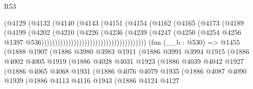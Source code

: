 \begin{lexlean}{R53}
\begin{coremodule}
                                            (@4129
                                              (@4132
                                                (@4140
                                                  (@4143
                                                    (@4151
                                                      (@4154
                                                        (@4162
                                                          (@4165
                                                            (@4173
                                                              (@4189
                                                                (@4199
                                                                  (@4202
                                                                    (@4210
                                                                      (@4226
                                                                        (@4236
                                                                          (@4239
                                                                            (@4247
                                                                              (@4250
                                                                                (@4254
                                                                                  @4256
                                                                                  @1397
                                                                                  @536)))))))))))))))))))))))))))))))))))))))
    (fun (__b : @530) =>
    @1455
      (@1888
        @1907
        (@1886
          @3980
          @3983
          @1911
          (@1886
            @3991
            @3994
            @1915
            (@1886
              @4002
              @4005
              @1919
              (@1886
                @4028
                @4031
                @1923
                (@1886
                  @4039
                  @4042
                  @1927
                  (@1886
                    @4065
                    @4068
                    @1931
                    (@1886
                      @4076
                      @4079
                      @1935
                      (@1886
                        @4087
                        @4090
                        @1939
                        (@1886
                          @4113
                          @4116
                          @1943
                          (@1886
                            @4124
                            @4127

\end{coremodule}
\end{lexlean}
